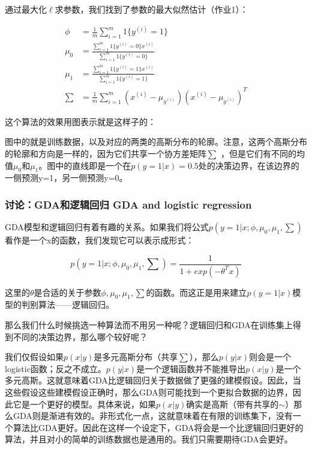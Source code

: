 \documentclass[UTF8]{ctexart}
\begin{document}
通过最大化$\ell$求参数，我们找到了参数的最大似然估计（作业1）：


\begin{align*}
\phi & = \frac{1}{m} \sum_{i=1}^{m}1\{y^{(i)} =1  \} \\
\mu_{0} & = \frac{\sum_{i=1}^{m}1\{y^{(i)}=0\}x^{(i)}} {\sum_{i=1}^{m}1\{y^{(i)}=0\}}\\
\mu_{1} & = \frac{\sum_{i=1}^{m}1\{y^{(i)}=1\}x^{(i)} } {\sum_{i=1}^{m}1\{y^{(i)}=1\}}  \\
\sum & = \frac{1}{m} \sum_{i=1}^{m} (x^{(i)}-\mu_{y^{(i)}})(x^{(i)}-\mu_{y^{(i)}})^{T}
\end{align*}

这个算法的效果用图表示就是这样子的：

\begin{figure}[htb]        
\end{figure}


图中的就是训练数据，以及对应的两类的高斯分布的轮廓。注意，这两个高斯分布的轮廓和方向是一样的，因为它们共享一个协方差矩阵$\sum$ ，但是它们有不同的均值$\mu_{0}$和$\mu_{1}$。图中的直线即是一个在$p(y=1|x)=0.5$处的决策边界，在该边界的一侧预测y=1，另一侧预测y=0。

\subsubsection{讨论：GDA和逻辑回归 GDA and logistic regression}

GDA模型和逻辑回归有着有趣的关系。如果我们将公式$p(y=1|x;\phi,\mu_{0},\mu_{1},\sum)$看作是一个x的函数，我们发现它可以表示成形式：

\[ p(y=1|x;\phi,\mu_{0},\mu_{1},\sum) = \frac{1 }{1+exp(-\theta^{T}x)}\]

这里的$\theta$是合适的关于参数$\phi,\mu_{0},\mu_{1},\sum$的函数。而这正是用来建立$p(y=1|x)$模型的判别算法——逻辑回归。

那么我们什么时候挑选一种算法而不用另一种呢？逻辑回归和GDA在训练集上得到不同的决策边界，那么哪个较好呢？


我们仅假设如果$p(x|y)$是多元高斯分布（共享$\sum$），那么$p(y|x)$则会是一个logistic函数；反之不成立。$p(y|x)$是一个逻辑函数并不能推导出$p(x|y)$是一个多元高斯。这就意味着GDA比逻辑回归关于数据做了更强的建模假设。因此，当这些假设这些建模假设正确时，那么GDA则可能找到一个更拟合数据的边界，因此它是一个更好的模型。具体来说，如果$p(x|y)$确实是高斯（带有共享的$\sim$）那么GDA则是渐进有效的。非形式化一点，这就意味着在有限的训练集下，没有一个算法比GDA更好。因此在这样一个设定下，GDA将会是一个比逻辑回归更好的算法，并且对小的简单的训练数据也是通用的。我们只需要期待GDA会更好。
\end{document}
